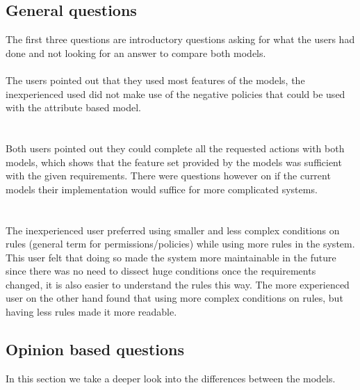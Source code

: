 \subsection{General questions}
The first three questions are introductory questions asking for what the users had done and not looking for an answer to compare both models.
\clearpage
\textbf{ }
\\
\\
The users pointed out that they used most features of the models, the inexperienced used did not make use of the negative policies that could be used with the attribute based model.
\\

\textbf{ }
\\
\\
Both users pointed out they could complete all the requested actions with both models, which shows that the feature set provided by the models was sufficient with the given requirements.
There were questions however on if the current models their implementation would suffice for more complicated systems.
\\

\textbf{ }
\\
\\
The inexperienced user preferred using smaller and less complex conditions on rules (general term for permissions/policies) while using more rules in the system.
This user felt that doing so made the system more maintainable in the future since there was no need to dissect huge conditions once the requirements changed, it is also easier to understand the rules this way.
The more experienced user on the other hand found that using more complex conditions on rules, but having less rules made it more readable.

\subsection{Opinion based questions}
In this section we take a deeper look into the differences between the models.
\\

